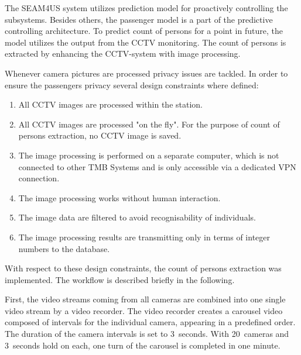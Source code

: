 The SEAM4US system utilizes prediction model for proactively controlling the subsystems. Besides others, the passenger model is a part of the predictive controlling architecture.
To predict count of persons for a point in future, the model utilizes the output from the CCTV monitoring. The count of persons is extracted by enhancing the CCTV-system with image processing.

Whenever camera pictures are processed privacy issues are tackled. In order to ensure the passengers privacy several design constraints where defined:

\begin{enumerate}\setlength{\itemsep}{-2pt}
  \item All CCTV images are processed within the station.
  \item All CCTV images are processed "on the fly". For the purpose of count of persons extraction, no CCTV image is saved.
  \item The image processing is performed on a separate computer, which is not connected to other TMB Systems and is only accessible via a dedicated VPN connection.
  \item The image processing works without human interaction.
  \item The image data are filtered to avoid recognisability of individuals.
  \item The image processing results are transmitting only in terms of integer numbers to the database.
\end{enumerate}

With respect to these design constraints, the count of persons extraction was implemented. The workflow is described briefly in the following.

First, the video streams coming from all cameras are combined into one single video stream by a video recorder. The video recorder creates a carousel video composed of intervals for the individual camera, appearing in a predefined order. The duration of the camera intervals is set to 3~seconds. With 20~cameras and 3~seconds hold on each, one turn of the carousel is completed in one minute.

